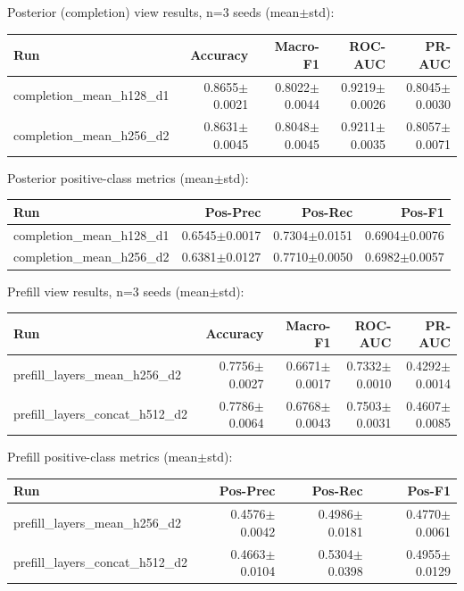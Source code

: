 \documentclass[11pt]{article}
\begin{document}
\noindent
Posterior (completion) view results, n=3 seeds (mean$\pm$std):
\begin{center}
\begin{tabular}{@{}lrrrr@{}}
\toprule
Run & Accuracy & Macro-F1 & ROC-AUC & PR-AUC \\
\midrule
completion\_mean\_h128\_d1 & 0.8655$\pm$0.0021 & 0.8022$\pm$0.0044 & 0.9219$\pm$0.0026 & 0.8045$\pm$0.0030 \\
completion\_mean\_h256\_d2 & 0.8631$\pm$0.0045 & 0.8048$\pm$0.0045 & 0.9211$\pm$0.0035 & 0.8057$\pm$0.0071 \\
\bottomrule
\end{tabular}
\end{center}

\noindent
Posterior positive-class metrics (mean$\pm$std):
\begin{center}
\begin{tabular}{@{}lrrr@{}}
\toprule
Run & Pos-Prec & Pos-Rec & Pos-F1 \\
\midrule
completion\_mean\_h128\_d1 & 0.6545$\pm$0.0017 & 0.7304$\pm$0.0151 & 0.6904$\pm$0.0076 \\
completion\_mean\_h256\_d2 & 0.6381$\pm$0.0127 & 0.7710$\pm$0.0050 & 0.6982$\pm$0.0057 \\
\bottomrule
\end{tabular}
\end{center}

\noindent
Prefill view results, n=3 seeds (mean$\pm$std):
\begin{center}
\begin{tabular}{@{}lrrrr@{}}
\toprule
Run & Accuracy & Macro-F1 & ROC-AUC & PR-AUC \\
\midrule
prefill\_layers\_mean\_h256\_d2 & 0.7756$\pm$0.0027 & 0.6671$\pm$0.0017 & 0.7332$\pm$0.0010 & 0.4292$\pm$0.0014 \\
prefill\_layers\_concat\_h512\_d2 & 0.7786$\pm$0.0064 & 0.6768$\pm$0.0043 & 0.7503$\pm$0.0031 & 0.4607$\pm$0.0085 \\
\bottomrule
\end{tabular}
\end{center}

\noindent
Prefill positive-class metrics (mean$\pm$std):
\begin{center}
\begin{tabular}{@{}lrrr@{}}
\toprule
Run & Pos-Prec & Pos-Rec & Pos-F1 \\
\midrule
prefill\_layers\_mean\_h256\_d2 & 0.4576$\pm$0.0042 & 0.4986$\pm$0.0181 & 0.4770$\pm$0.0061 \\
prefill\_layers\_concat\_h512\_d2 & 0.4663$\pm$0.0104 & 0.5304$\pm$0.0398 & 0.4955$\pm$0.0129 \\
\bottomrule
\end{tabular}
\end{center}
\end{document}
